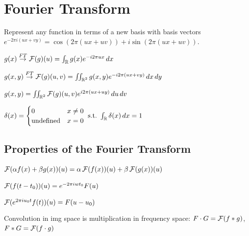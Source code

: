 \section{Fourier Transform}
Represent any function in terms of a new basis with basis vectors \(e^{-2\pi i(ux + vy)} = \cos(2\pi(ux + uv)) + i \sin(2\pi(ux + uv))\).

\begin{definition}[1D-FT]
  \(g(x) \overset{FT}{\to} \operatorname{\mathcal{F}}(g)(u) = \int_{\operatorname{\mathbb{R}}} g(x) e^{-i2\pi ux} \, dx\)
\end{definition}

\begin{definition}[2D-FT]
  \(g(x, y) \overset{FT}{\to} \operatorname{\mathcal{F}}(g)(u, v) = \iint_{\operatorname{\mathbb{R}}^2} g(x, y) e^{-i2\pi (ux + vy)} \,dx \,dy\)
\end{definition}

\begin{definition}[Inverse FT]
  \(g(x, y) = \iint_{\operatorname{\mathbb{R}}^2} \operatorname{\mathcal{F}}(g)(u, v) e^{i2\pi(ux + uy)} \,du \,dv\)
\end{definition}

\begin{definition}
  \(\delta(x) = \begin{cases}
    0 & x \neq 0 \\
    \text{undefined} & x = 0
  \end{cases} \ \text{s.t.} \ \int_{\operatorname{\mathbb{R}}} \delta(x) \,dx = 1\)
\end{definition}

\subsection{Properties of the Fourier Transform}

\begin{definition}[Lin.]
  \(\operatorname{\mathcal{F}}(\alpha f(x) + \beta g(x))(u) = \alpha \operatorname{\mathcal{F}}(f(x))(u) + \beta \operatorname{\mathcal{F}}(g(x))(u)\)
\end{definition}

\begin{definition}
  \(\operatorname{\mathcal{F}}(f(t - t_0))(u) = e^{-2 \pi iwt_0 } F(u)\)
\end{definition}

\begin{definition}
  \(\operatorname{\mathcal{F}}(e^{2 \pi iu_0t}f(t))(u) = F(u - u_0)\)
\end{definition}

\begin{algorithm}
  Convolution in img space is multiplication in frequency space: \(F \cdot G = \operatorname{\mathcal{F}}(f \ast g)\), \(F \ast G = \operatorname{\mathcal{F}}(f \cdot g)\)
\end{algorithm}

